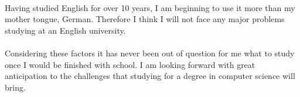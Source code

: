 \documentclass[11pt]{article}
\begin{document}
\paragraph{}
Having studied English for over 10 years, I am beginning to use it more than my mother tongue, German. Therefore I think I will not face any major problems studying at an English university.
\paragraph{}
Considering these factors it has never been out of question for me what to study once I would be finished with school. I am looking forward with great anticipation to the challenges that studying for a degree in computer science will bring.
\end{document}
